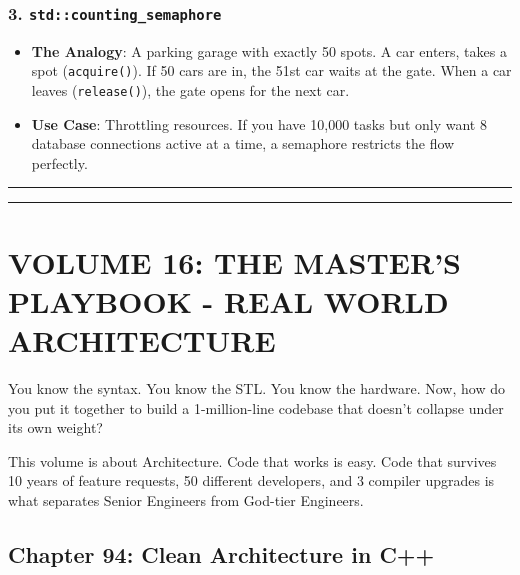 \hypertarget{stdcounting_semaphore}{%
\subsubsection{\texorpdfstring{3.
\texttt{std::counting\_semaphore}}{3. std::counting\_semaphore}}\label{stdcounting_semaphore}}

\begin{itemize}
\tightlist
\item
  \textbf{The Analogy}: A parking garage with exactly 50 spots. A car
  enters, takes a spot (\passthrough{\lstinline!acquire()!}). If 50 cars
  are in, the 51st car waits at the gate. When a car leaves
  (\passthrough{\lstinline!release()!}), the gate opens for the next
  car.
\item
  \textbf{Use Case}: Throttling resources. If you have 10,000 tasks but
  only want 8 database connections active at a time, a semaphore
  restricts the flow perfectly.
\end{itemize}

\begin{center}\rule{0.5\linewidth}{0.5pt}\end{center}

\begin{center}\rule{0.5\linewidth}{0.5pt}\end{center}

\hypertarget{volume-16-the-masters-playbook---real-world-architecture}{%
\section{VOLUME 16: THE MASTER'S PLAYBOOK - REAL WORLD
ARCHITECTURE}\label{volume-16-the-masters-playbook---real-world-architecture}}

You know the syntax. You know the STL. You know the hardware. Now, how
do you put it together to build a 1-million-line codebase that doesn't
collapse under its own weight?

This volume is about Architecture. Code that works is easy. Code that
survives 10 years of feature requests, 50 different developers, and 3
compiler upgrades is what separates Senior Engineers from God-tier
Engineers.

\hypertarget{chapter-94-clean-architecture-in-c}{%
\subsection{Chapter 94: Clean Architecture in
C++}\label{chapter-94-clean-architecture-in-c}}

